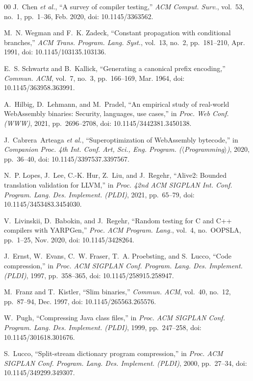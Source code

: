 \documentclass{ieeeaccess}
\begin{document}
\begin{thebibliography}{00}
J.~Chen \emph{et al.}, ``A survey of compiler testing,'' \emph{ACM Comput. Surv.}, vol.~53, no.~1, pp.~1--36, Feb. 2020, doi: 10.1145/3363562.

M.~N. Wegman and F.~K. Zadeck, ``Constant propagation with conditional branches,'' \emph{ACM Trans. Program. Lang. Syst.}, vol.~13, no.~2, pp.~181--210, Apr. 1991, doi: 10.1145/103135.103136.

E.~S. Schwartz and B.~Kallick, ``Generating a canonical prefix encoding,'' \emph{Commun. ACM}, vol.~7, no.~3, pp.~166--169, Mar. 1964, doi: 10.1145/363958.363991.

A.~Hilbig, D.~Lehmann, and M.~Pradel, ``An empirical study of real-world WebAssembly binaries: Security, languages, use cases,'' in \emph{Proc. Web Conf. (WWW)}, 2021, pp.~2696--2708, doi: 10.1145/3442381.3450138.

J.~Cabrera~Arteaga \emph{et al.}, ``Superoptimization of WebAssembly bytecode,'' in \emph{Companion Proc. 4th Int. Conf. Art, Sci., Eng. Program. ($\langle$Programming$\rangle$)}, 2020, pp.~36--40, doi: 10.1145/3397537.3397567.

N.~P. Lopes, J.~Lee, C.-K. Hur, Z.~Liu, and J.~Regehr, ``Alive2: Bounded translation validation for LLVM,'' in \emph{Proc. 42nd ACM SIGPLAN Int. Conf. Program. Lang. Des. Implement. (PLDI)}, 2021, pp.~65--79, doi: 10.1145/3453483.3454030.

V.~Livinskii, D.~Babokin, and J.~Regehr, ``Random testing for C and C++ compilers with YARPGen,'' \emph{Proc. ACM Program. Lang.}, vol.~4, no.~OOPSLA, pp.~1--25, Nov. 2020, doi: 10.1145/3428264.

J.~Ernst, W.~Evans, C.~W. Fraser, T.~A. Proebsting, and S.~Lucco, ``Code compression,'' in \emph{Proc. ACM SIGPLAN Conf. Program. Lang. Des. Implement. (PLDI)}, 1997, pp.~358--365, doi: 10.1145/258915.258947.

M.~Franz and T.~Kistler, ``Slim binaries,'' \emph{Commun. ACM}, vol.~40, no.~12, pp.~87--94, Dec. 1997, doi: 10.1145/265563.265576.

W.~Pugh, ``Compressing Java class files,'' in \emph{Proc. ACM SIGPLAN Conf. Program. Lang. Des. Implement. (PLDI)}, 1999, pp.~247--258, doi: 10.1145/301618.301676.

S.~Lucco, ``Split-stream dictionary program compression,'' in \emph{Proc. ACM SIGPLAN Conf. Program. Lang. Des. Implement. (PLDI)}, 2000, pp.~27--34, doi: 10.1145/349299.349307.


\end{thebibliography}
\end{document}

